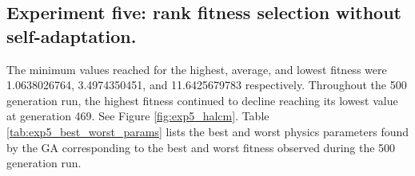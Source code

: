 

\newpage

\subsection[Experiment Five]{Experiment five: rank fitness selection without self-adaptation.}

The minimum values reached for the highest, average, and lowest fitness were 1.0638026764, 3.4974350451, and 11.6425679783 respectively. Throughout the 500 generation run, the highest fitness continued to decline reaching its lowest value at generation 469. See Figure \ref{fig:exp5_halcm}. Table \ref{tab:exp5_best_worst_params} lists the best and worst physics parameters found by the GA corresponding to the best and worst fitness observed during the 500 generation run.

